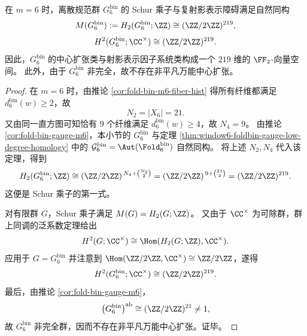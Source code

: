 \begin{theorem}\label{thm:conclusion-foldbin-gauge-schur-multiplier-rank}
在 \(m=6\) 时，离散规范群 \(G_6^{\mathrm{bin}}\) 的 Schur 乘子与复射影表示障碍满足自然同构
\[
M(G_6^{\mathrm{bin}})
:=
H_2(G_6^{\mathrm{bin}};\ZZ)
\cong
(\ZZ/2\ZZ)^{219},
\]
\[
H^2(G_6^{\mathrm{bin}};\CC^\times)
\cong
(\ZZ/2\ZZ)^{219}.
\]
因此，\(G_6^{\mathrm{bin}}\) 的中心扩张类与射影表示因子系统类构成一个 \(219\) 维的 \(\FF_2\)-向量空间。
此外，由于 \(G_6^{\mathrm{bin}}\) 非完全，故不存在非平凡万能中心扩张。
\end{theorem}
\begin{proof}
在 \(m=6\) 时，由推论 \ref{cor:fold-bin-m6-fiber-hist} 得所有纤维都满足 \(d^{\mathrm{bin}}_6(w)\ge 2\)，故
\[
N_2=|X_6|=21.
\]
又由同一直方图可知恰有 \(9\) 个纤维满足 \(d^{\mathrm{bin}}_6(w)\ge 4\)，故 \(N_4=9\)。
由推论 \ref{cor:fold-bin-gauge-m6}，本小节的 \(G_6^{\mathrm{bin}}\) 与定理 \ref{thm:window6-foldbin-gauge-low-degree-homology} 中的
\(\mathcal G_6^{\mathrm{bin}}=\Aut(\Fold_6^{\mathrm{bin}})\)
自然同构。
将上述 \(N_2,N_4\) 代入该定理，得到
\[
H_2(G_6^{\mathrm{bin}};\ZZ)
\cong
(\ZZ/2\ZZ)^{\,N_4+\binom{N_2}{2}}
=
(\ZZ/2\ZZ)^{\,9+\binom{21}{2}}
=
(\ZZ/2\ZZ)^{219}.
\]
这便是 Schur 乘子的第一式。
\par
对有限群 \(G\)，Schur 乘子满足 \(M(G)=H_2(G;\ZZ)\)。
又由于 \(\CC^\times\) 为可除群，群上同调的泛系数定理给出
\[
H^2(G;\CC^\times)\cong \Hom(H_2(G;\ZZ),\CC^\times).
\]
应用于 \(G=G_6^{\mathrm{bin}}\) 并注意到 \(\Hom(\ZZ/2\ZZ,\CC^\times)\cong \ZZ/2\ZZ\)，遂得
\[
H^2(G_6^{\mathrm{bin}};\CC^\times)\cong (\ZZ/2\ZZ)^{219}.
\]
最后，由推论 \ref{cor:fold-bin-gauge-m6}，
\[
\bigl(G_6^{\mathrm{bin}}\bigr)^{\mathrm{ab}}\cong (\ZZ/2\ZZ)^{21}\neq 1,
\]
故 \(G_6^{\mathrm{bin}}\) 非完全群，因而不存在非平凡万能中心扩张。证毕。
\end{proof}

